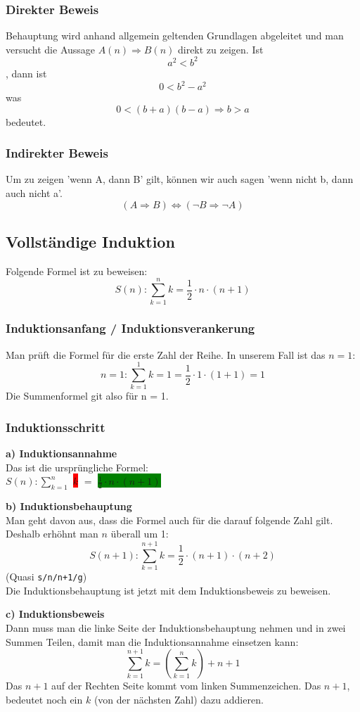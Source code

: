   \subsubsection{Direkter Beweis}
  Behauptung wird anhand allgemein geltenden Grundlagen abgeleitet und man versucht die Aussage $A(n) \Rightarrow B(n)$ direkt zu zeigen.
  Ist \[a^2 < b^2\], dann ist \[0 < b^2 - a^2\] was \[0 < (b + a)(b - a)
  \Rightarrow b > a\] bedeutet.
  \subsubsection{Indirekter Beweis}
  Um zu zeigen 'wenn A, dann B' gilt, können wir auch sagen 'wenn nicht b, dann auch nicht a'.
  \[ (A \Rightarrow B) \Leftrightarrow (\neg B \Rightarrow \neg A) \]

\subsection{Vollständige Induktion}
Folgende Formel ist zu beweisen:
\[ S(n): \sum\limits_{k=1}^n k = \frac{1}{2} \cdot n \cdot (n + 1)\]
\subsubsection{Induktionsanfang / Induktionsverankerung}
Man prüft die Formel für die erste Zahl der Reihe. In unserem Fall ist
das $n = 1$:
\[ n = 1: \sum\limits_{k=1}^1 k = 1 = \frac{1}{2} \cdot 1 \cdot (1 + 1) = 1\]
Die Summenformel git also für n = 1.

\subsubsection{Induktionsschritt}
\textbf{a) Induktionsannahme} \\
Das ist die ursprüngliche Formel:
\\ $S(n): \sum\limits_{k=1}^n $ \colorbox{red}{$ k $} $ = $ \colorbox{green}{$\frac{1}{2} \cdot n \cdot (n + 1)$}

\textbf{b) Induktionsbehauptung} \\
Man geht davon aus, dass die Formel auch für die darauf folgende Zahl
gilt. Deshalb erhöhnt man $n$ überall um 1:
 \[ S(n + 1): \sum\limits_{k=1}^{n+1} k = \frac{1}{2} \cdot (n + 1) \cdot (n + 2)\]
(Quasi \texttt{s/n/n+1/g}) \\
Die Induktionsbehauptung ist jetzt mit dem Induktionsbeweis zu beweisen.

\textbf{c) Induktionsbeweis} \\
Dann muss man die linke Seite der Induktionsbehauptung nehmen und in zwei Summen Teilen,
damit man die Induktionsannahme einsetzen kann:
 \[ \sum\limits_{k=1}^{n+1} k = \left( \sum\limits_{k=1}^{n} k \right) + n + 1 \]
Das $n + 1$ auf der Rechten Seite kommt vom linken Summenzeichen.
Das $n + 1$, bedeutet noch ein $k$ (von der nächsten Zahl) dazu addieren.

